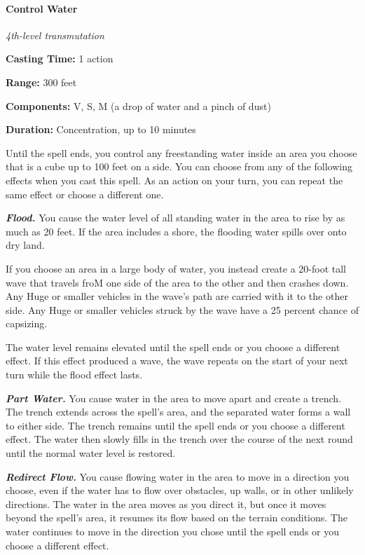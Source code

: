 \documentclass[
]{article}
\begin{document}
\hypertarget{control-water}{%
\paragraph{Control Water}\label{control-water}}

\emph{4th-level transmutation}

\textbf{Casting Time:} 1 action

\textbf{Range:} 300 feet

\textbf{Components:} V, S, M (a drop of water and a pinch of dust)

\textbf{Duration:} Concentration, up to 10 minutes

Until the spell ends, you control any freestanding water inside an area
you choose that is a cube up to 100 feet on a side. You can choose from
any of the following effects when you cast this spell. As an action on
your turn, you can repeat the same effect or choose a different one.

\emph{\textbf{Flood.}} You cause the water level of all standing water
in the area to rise by as much as 20 feet. If the area includes a shore,
the flooding water spills over onto dry land.

If you choose an area in a large body of water, you instead create a
20-foot tall wave that travels froM one side of the area to the other
and then crashes down. Any Huge or smaller vehicles in the wave's path
are carried with it to the other side. Any Huge or smaller vehicles
struck by the wave have a 25 percent chance of capsizing.

The water level remains elevated until the spell ends or you choose a
different effect. If this effect produced a wave, the wave repeats on
the start of your next turn while the flood effect lasts.

\emph{\textbf{Part Water.}} You cause water in the area to move apart
and create a trench. The trench extends across the spell's area, and the
separated water forms a wall to either side. The trench remains until
the spell ends or you choose a different effect. The water then slowly
fills in the trench over the course of the next round until the normal
water level is restored.

\emph{\textbf{Redirect Flow.}} You cause flowing water in the area to
move in a direction you choose, even if the water has to flow over
obstacles, up walls, or in other unlikely directions. The water in the
area moves as you direct it, but once it moves beyond the spell's area,
it resumes its flow based on the terrain conditions. The water continues
to move in the direction you chose until the spell ends or you choose a
different effect.
\end{document}
